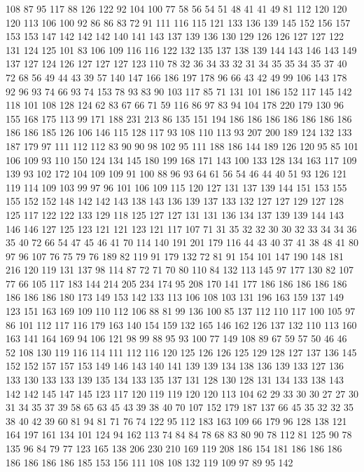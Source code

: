108 87 95 117 88 126 122 92 104 100 77 58 56 54 51 48 41 41 49 81
112 120 120 120 113 106 100 92 86 86 83 72 91 111 116 115 121 133 136 139
145 152 156 157 153 153 147 142 142 142 140 141 143 137 139 136 130 129 126 126
127 127 122 131 124 125 101 83 106 109 116 116 122 132 135 137 138 139 144 143
146 143 149 137 127 124 126 127 127 127 123 110 78 32 36 34 33 32 31 34
35 35 34 35 37 40 72 68 56 49 44 43 39 57 140 147 166 186 197 178
96 66 43 42 49 99 106 143 178 92 96 93 74 66 93 74 153 78 93 83
90 103 117 85 71 131 101 186 152 117 145 142 118 101 108 128 124 62 83 67
66 71 59 116 86 97 83 94 104 178 220 179 130 96 155 168 175 113 99 171
188 231 213 86 135 151 194 186 186 186 186 186 186 186 186 186 185 126 106 146
115 128 117 93 108 110 113 93 207 200 189 124 132 133 187 179 97 111 112 112
83 90 90 98 102 95 111 188 186 144 189 126 120 95 85 101 106 109 93 110
150 124 134 145 180 199 168 171 143 100 133 128 134 163 117 109 139 93 102 172
104 109 109 91 100 88 96 93 64 61 56 54 46 44 40 51 93 126 121 119
114 109 103 99 97 96 101 106 109 115 120 127 131 137 139 144 151 153 155 155
152 152 148 142 142 143 138 143 136 139 137 133 132 127 127 129 127 128 125 117
122 122 133 129 118 125 127 127 131 131 136 134 137 139 139 144 143 146 146 127
125 123 121 121 123 121 117 107 71 31 35 32 32 30 30 32 33 34 34 36
35 40 72 66 54 47 45 46 41 70 114 140 191 201 179 116 44 43 40 37
41 38 48 41 80 97 96 107 76 75 79 76 189 82 119 91 179 132 72 81
91 154 101 147 190 148 181 216 120 119 131 137 98 114 87 72 71 70 80 110
84 132 113 145 97 177 130 82 107 77 66 105 117 183 144 214 205 234 174 95
208 170 141 177 186 186 186 186 186 186 186 186 180 173 149 153 142 133 113 106
108 103 131 196 163 159 137 149 123 151 163 169 109 110 112 106 88 81 99 136
100 85 137 112 110 117 100 105 97 86 101 112 117 116 179 163 140 154 159 132
165 146 162 126 137 132 110 113 160 163 141 164 169 94 106 121 98 99 88 95
93 100 77 149 108 89 67 59 57 50 46 46 52 108 130 119 116 114 111 112
116 120 125 126 126 125 129 128 127 137 136 145 152 152 157 157 153 149 146 143
140 141 139 139 134 138 136 139 133 127 136 133 130 133 133 139 135 134 133 135
137 131 128 130 128 131 134 133 138 143 142 142 145 147 145 123 117 120 119 119
120 120 113 104 62 29 33 30 30 27 27 30 31 34 35 37 39 58 65 63
45 43 39 38 40 70 107 152 179 187 137 66 45 35 32 32 35 38 40 42
39 60 81 94 81 71 76 74 122 95 112 183 163 109 66 179 96 128 138 121
164 197 161 134 101 124 94 162 113 74 84 84 78 68 83 80 90 78 112 81
125 90 78 135 96 84 79 77 123 165 138 206 230 210 169 119 208 186 154 181
186 186 186 186 186 186 186 185 153 156 111 108 108 132 119 109 97 89 95 142

